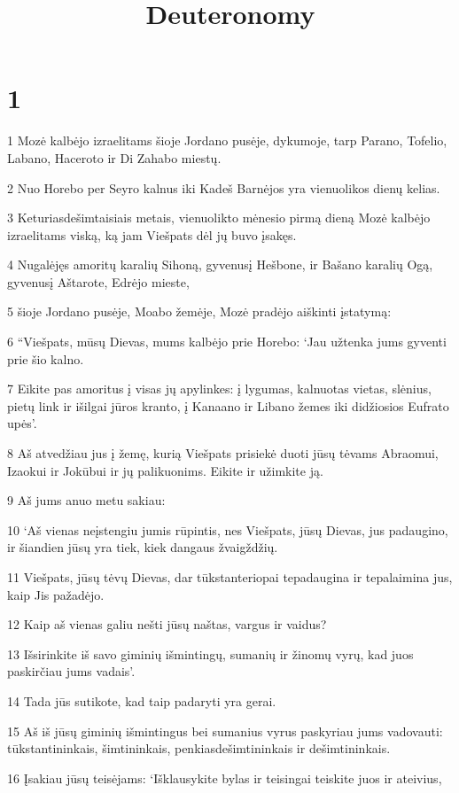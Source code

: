 

\title{Deuteronomy}

\chapter{1}


\par 1 Mozė kalbėjo izraelitams šioje Jordano pusėje, dykumoje, tarp Parano, Tofelio, Labano, Haceroto ir Di Zahabo miestų. 
\par 2 Nuo Horebo per Seyro kalnus iki Kadeš Barnėjos yra vienuolikos dienų kelias. 
\par 3 Keturiasdešimtaisiais metais, vienuolikto mėnesio pirmą dieną Mozė kalbėjo izraelitams viską, ką jam Viešpats dėl jų buvo įsakęs. 
\par 4 Nugalėjęs amoritų karalių Sihoną, gyvenusį Hešbone, ir Bašano karalių Ogą, gyvenusį Aštarote, Edrėjo mieste, 
\par 5 šioje Jordano pusėje, Moabo žemėje, Mozė pradėjo aiškinti įstatymą: 
\par 6 “Viešpats, mūsų Dievas, mums kalbėjo prie Horebo: ‘Jau užtenka jums gyventi prie šio kalno. 
\par 7 Eikite pas amoritus į visas jų apylinkes: į lygumas, kalnuotas vietas, slėnius, pietų link ir išilgai jūros kranto, į Kanaano ir Libano žemes iki didžiosios Eufrato upės’. 
\par 8 Aš atvedžiau jus į žemę, kurią Viešpats prisiekė duoti jūsų tėvams Abraomui, Izaokui ir Jokūbui ir jų palikuonims. Eikite ir užimkite ją. 
\par 9 Aš jums anuo metu sakiau: 
\par 10 ‘Aš vienas neįstengiu jumis rūpintis, nes Viešpats, jūsų Dievas, jus padaugino, ir šiandien jūsų yra tiek, kiek dangaus žvaigždžių. 
\par 11 Viešpats, jūsų tėvų Dievas, dar tūkstanteriopai tepadaugina ir tepalaimina jus, kaip Jis pažadėjo. 
\par 12 Kaip aš vienas galiu nešti jūsų naštas, vargus ir vaidus? 
\par 13 Išsirinkite iš savo giminių išmintingų, sumanių ir žinomų vyrų, kad juos paskirčiau jums vadais’. 
\par 14 Tada jūs sutikote, kad taip padaryti yra gerai. 
\par 15 Aš iš jūsų giminių išmintingus bei sumanius vyrus paskyriau jums vadovauti: tūkstantininkais, šimtininkais, penkiasdešimtininkais ir dešimtininkais. 
\par 16 Įsakiau jūsų teisėjams: ‘Išklausykite bylas ir teisingai teiskite juos ir ateivius, 
